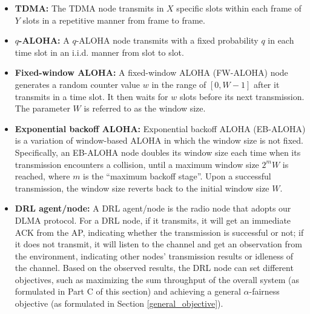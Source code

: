 \documentclass[journal,comsoc]{IEEEtran}
\begin{document}
\begin{itemize}
\item \textbf{TDMA:} The TDMA node transmits in  $ X $ specific slots within each frame of $ Y $ slots in a repetitive manner from frame to frame.
\item \textbf{$  q$-ALOHA:}  A  $ q $-ALOHA node transmits with a fixed probability  $ q $ in each time slot in an i.i.d. manner from slot to slot. 
\item \textbf{Fixed-window ALOHA:} A fixed-window ALOHA (FW-ALOHA) node generates a random counter value $ w $  in the range of  $ \left[0, W-1 \right]  $  after it transmits in a time slot. It then waits for  $ w $ slots before its next transmission. The parameter $ W $  is referred to as the window size. 
\item \textbf{Exponential backoff ALOHA:} Exponential backoff ALOHA (EB-ALOHA) is a variation of window-based ALOHA in which the window size is not fixed. Specifically, an EB-ALOHA node doubles its window size each time when its transmission encounters a collision, until a maximum window size $ 2^mW $  is reached, where  $ m $ is the ``maximum backoff stage''. Upon a successful transmission, the window size reverts back to the initial window size  $ W $.
\item \textbf{DRL agent/node:} A DRL agent/node is the radio node that adopts our DLMA protocol. For a DRL node, if it transmits, it will get an immediate ACK from the AP, indicating whether the transmission is successful or not; if it does not transmit, it will listen to the channel and get an observation from the environment, indicating other nodes' transmission results or idleness of the channel. Based on the observed results, the DRL node can set different objectives, such as maximizing the sum throughput of the overall system (as formulated in Part C of this section) and achieving a general  $ \alpha $-fairness objective (as formulated in Section \ref{general_objective}).
\end{itemize}
\end{document}
